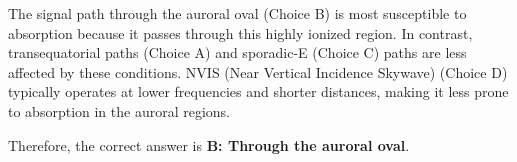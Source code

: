 The signal path through the auroral oval (Choice B) is most susceptible to absorption because it passes through this highly ionized region. In contrast, transequatorial paths (Choice A) and sporadic-E (Choice C) paths are less affected by these conditions. NVIS (Near Vertical Incidence Skywave) (Choice D) typically operates at lower frequencies and shorter distances, making it less prone to absorption in the auroral regions.

Therefore, the correct answer is \textbf{B: Through the auroral oval}.

